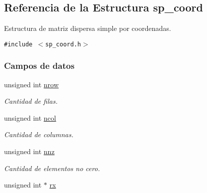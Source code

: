 \hypertarget{structsp__coord}{
\subsection{Referencia de la Estructura sp\_\-coord}
\label{structsp__coord}
}
Estructura de matriz dispersa simple por coordenadas.  


{\tt \#include $<$sp\_\-coord.h$>$}

\subsubsection*{Campos de datos}
\begin{CompactItemize}
\item 
\hypertarget{structsp__coord_adf22f93c8e3ce7303018ba9a01ea092}{
unsigned int \hyperlink{structsp__coord_adf22f93c8e3ce7303018ba9a01ea092}{nrow}}
\label{structsp__coord_adf22f93c8e3ce7303018ba9a01ea092}

\begin{CompactList}\small\item\em Cantidad de filas. \item\end{CompactList}\item 
\hypertarget{structsp__coord_b962ad3a8f62df6906409d1392611c63}{
unsigned int \hyperlink{structsp__coord_b962ad3a8f62df6906409d1392611c63}{ncol}}
\label{structsp__coord_b962ad3a8f62df6906409d1392611c63}

\begin{CompactList}\small\item\em Cantidad de columnas. \item\end{CompactList}\item 
\hypertarget{structsp__coord_f36cd76459da9943ba491ee4a3b1f467}{
unsigned int \hyperlink{structsp__coord_f36cd76459da9943ba491ee4a3b1f467}{nnz}}
\label{structsp__coord_f36cd76459da9943ba491ee4a3b1f467}

\begin{CompactList}\small\item\em Cantidad de elementos no cero. \item\end{CompactList}\item 
\hypertarget{structsp__coord_a50e5d65cdb79f9a0f2b7d7505ce7c67}{
unsigned int $\ast$ \hyperlink{structsp__coord_a50e5d65cdb79f9a0f2b7d7505ce7c67}{rx}}
\label{structsp__coord_a50e5d65cdb79f9a0f2b7d7505ce7c67}


\end{CompactItemize}
